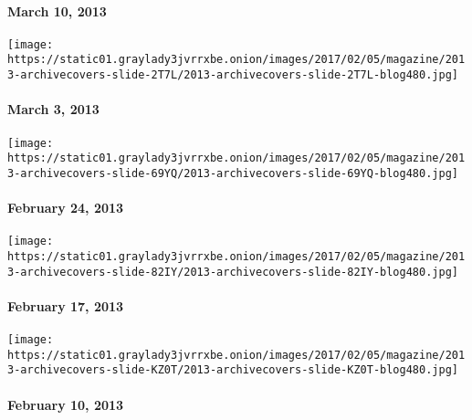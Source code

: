 \hypertarget{march-10-2013}{%
\paragraph{March 10, 2013}\label{march-10-2013}}

\href{http://www.nytimes3xbfgragh.onion/indexes/2013/03/03/magazine/index.html}{}

\texttt{[image: https://static01.graylady3jvrrxbe.onion/images/2017/02/05/magazine/2013-archivecovers-slide-2T7L/2013-archivecovers-slide-2T7L-blog480.jpg]}

\hypertarget{march-3-2013}{%
\paragraph{March 3, 2013}\label{march-3-2013}}

\href{http://www.nytimes3xbfgragh.onion/indexes/2013/02/24/magazine/index.html}{}

\texttt{[image: https://static01.graylady3jvrrxbe.onion/images/2017/02/05/magazine/2013-archivecovers-slide-69YQ/2013-archivecovers-slide-69YQ-blog480.jpg]}

\hypertarget{february-24-2013}{%
\paragraph{February 24, 2013}\label{february-24-2013}}

\href{http://www.nytimes3xbfgragh.onion/indexes/2013/02/17/magazine/index.html}{}

\texttt{[image: https://static01.graylady3jvrrxbe.onion/images/2017/02/05/magazine/2013-archivecovers-slide-82IY/2013-archivecovers-slide-82IY-blog480.jpg]}

\hypertarget{february-17-2013}{%
\paragraph{February 17, 2013}\label{february-17-2013}}

\href{http://www.nytimes3xbfgragh.onion/indexes/2013/02/10/magazine/index.html}{}

\texttt{[image: https://static01.graylady3jvrrxbe.onion/images/2017/02/05/magazine/2013-archivecovers-slide-KZ0T/2013-archivecovers-slide-KZ0T-blog480.jpg]}

\hypertarget{february-10-2013}{%
\paragraph{February 10, 2013}\label{february-10-2013}}

